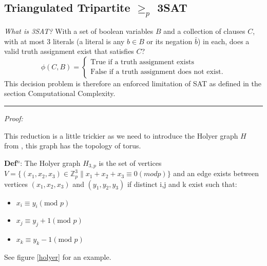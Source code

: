 \documentclass[a4paper,11pt]{report}
\newcounter{col}
\begin{document}
\subsection{Triangulated Tripartite $\geq_p$ 3SAT}

\textit{What is 3SAT?} With a set of boolean variables $B$ and a collection of clauses $C$, with at most 3 literals (a literal is any $b \in B$ or its negation $\bar{b}$) in each, does a valid truth assignment exist that satisfies $C$?
		\begin{equation}
		        \phi (C,B) = \begin{cases}
		            \text{True if a truth assignment exists} \\
		            \text{False if a truth assignment does not exist}.
				\end{cases}
		\end{equation}
This decision problem is therefore an enforced limitation of SAT as defined in the section Computational Complexity.

\noindent\rule{4cm}{0.4pt}

\textit{Proof:}

This reduction is a little trickier as we need to introduce the Holyer graph $H$ from \cite{holyer}, this graph has the topology of torus.

\textbf{Def$^n$}: The Holyer graph $H_{3,p}$ is the set of vertices $V=\{(x_1,x_2,x_3)\in \mathbb{Z}_p^3 \| x_1+x_2+x_3 \equiv 0 (mod p)\}$ and an edge exists between vertices $(x_1,x_2,x_3)$ and $(y_1,y_2,y_3)$ if distinct i,j and k exist such that:
\begin{itemize}
\item $x_i\equiv y_i (\text{mod }p)$
\item $x_j\equiv y_j+1 (\text{mod }p)$
\item $x_k\equiv y_k-1 (\text{mod }p)$
\end{itemize}
See figure \ref{holyer} for an example.
\end{document}
